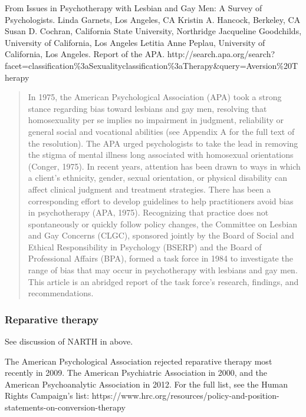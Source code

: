 \begin{refsection}
From Issues in Psychotherapy with Lesbian and Gay Men: A Survey of Psychologists. Linda Garnets, Los Angeles, CA Kristin A. Hancock, Berkeley, CA Susan D. Cochran, California State University, Northridge Jacqueline Goodchilds, University of California, Los Angeles Letitia Anne Peplau, University of California, Los Angeles. Report of the APA. http:\slash \slash search.apa.org\slash search?facet=classification\%3aSexuality\textbar{}\textbar{}classification\%3aTherapy\&query=Aversion\%20Therapy

\begin{quote}

In 1975, the American Psychological Association (APA) took a strong stance regarding bias toward lesbians and gay men, resolving that homosexuality per se implies no impairment in judgment, reliability or general social and vocational abilities (see Appendix A for the full text of the resolution). The APA urged psychologists to take the lead in removing the stigma of mental illness long associated with homosexual orientations (Conger, 1975). In recent years, attention has been drawn to ways in which a client's ethnicity, gender, sexual orientation, or physical disability can affect clinical judgment and treatment strategies. There has been a corresponding effort to develop guidelines to help practitioners avoid bias in psychotherapy (APA, 1975). Recognizing that practice does not spontaneously or quickly follow policy changes, the Committee on Lesbian and Gay Concerns (CLGC), sponsored jointly by the Board of Social and Ethical Responsibility in Psychology (BSERP) and the Board of Professional Affairs (BPA), formed a task force in 1984 to investigate the range of bias that may occur in psychotherapy with lesbians and gay men. This article is an abridged report of the task force's research, findings, and recommendations.
\end{quote}

\subsubsection{Reparative therapy}
\label{reparativetherapy}

See discussion of NARTH in  above.

The American Psychological Association rejected reparative therapy most recently in 2009. The American Psychiatric Association in 2000, and the American Psychoanalytic Association in 2012. For the full list, see the Human Rights Campaign’s list: https:\slash \slash www.hrc.org\slash resources\slash policy-and-position-statements-on-conversion-therapy


\end{refsection}
